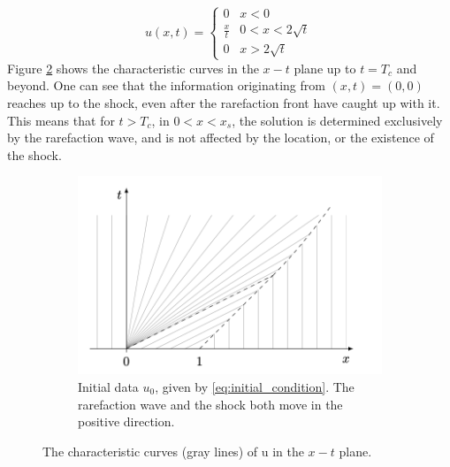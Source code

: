 \documentclass[10pt,letterpaper]{article}
\theoremstyle{break}
\begin{document}
\begin{solution}
\begin{itemize}
        $$
        u(x, t)=\left\{\begin{array}{ll}
        0 & x<0 \\
        \frac{x}{t} & 0<x<2 \sqrt{t} \\
        0 & x>2 \sqrt{t}
        \end{array}\right.
        $$
        Figure \ref{problem3_part2} shows the characteristic curves in the $x-t$ plane up to $t=T_{c}$ and beyond. One can see that the information originating from $(x, t)=(0,0)$ reaches up to the shock, even after the rarefaction front have caught up with it. This means that for $t>T_{c}$, in $0<x<x_{s}$, the solution is determined exclusively by the rarefaction wave, and is not affected by the location, or the existence of the shock.
        
        \begin{figure}
            \centering
            \begin{subfigure}[b]{0.5\textwidth}
                \includegraphics[width=\textwidth]{figures02/ex_set_2_4} 
                \caption{Initial data $u_0$, given by \eqref{eq:initial_condition}.
                The rarefaction wave and the shock both move in the positive direction.}
                \label{fig:u_0_later}
            \end{subfigure}
            \caption{The characteristic curves (gray lines) of u in the $x-t$ plane.}
            \label{problem3_part2}
        \end{figure}
    \end{itemize}
    
\end{solution}
\end{document}
